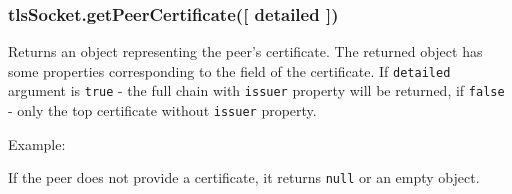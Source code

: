 \subsubsection{tlsSocket.getPeerCertificate({[} detailed
{]})}\label{tlssocket.getpeercertificate-detailed}

Returns an object representing the peer's certificate. The returned
object has some properties corresponding to the field of the
certificate. If \texttt{detailed} argument is \texttt{true} - the full
chain with \texttt{issuer} property will be returned, if \texttt{false}
- only the top certificate without \texttt{issuer} property.

Example:

\begin{Shaded}
\begin{Highlighting}[]
\NormalTok{\{ }\NormalTok{:}
   \NormalTok{\{ }\NormalTok{: }\NormalTok{,}
     \NormalTok{: }\NormalTok{,}
     \NormalTok{: }\NormalTok{,}
     \NormalTok{: }\NormalTok{,}
     \NormalTok{: }\NormalTok{,}
     \NormalTok{: } \NormalTok{\},}
  \NormalTok{:}
   \NormalTok{\{ }\NormalTok{: }\NormalTok{,}
     \NormalTok{: }\NormalTok{,}
     \NormalTok{: }\NormalTok{,}
     \NormalTok{: }\NormalTok{,}
     \NormalTok{: }\NormalTok{,}
     \NormalTok{: } \NormalTok{\},}
  \NormalTok{:}
     
  \NormalTok{: }\NormalTok{,}
  \NormalTok{: }\NormalTok{,}
  \NormalTok{: }\NormalTok{,}
  \NormalTok{: } \NormalTok{\}}
\end{Highlighting}
\end{Shaded}

If the peer does not provide a certificate, it returns \texttt{null} or
an empty object.

